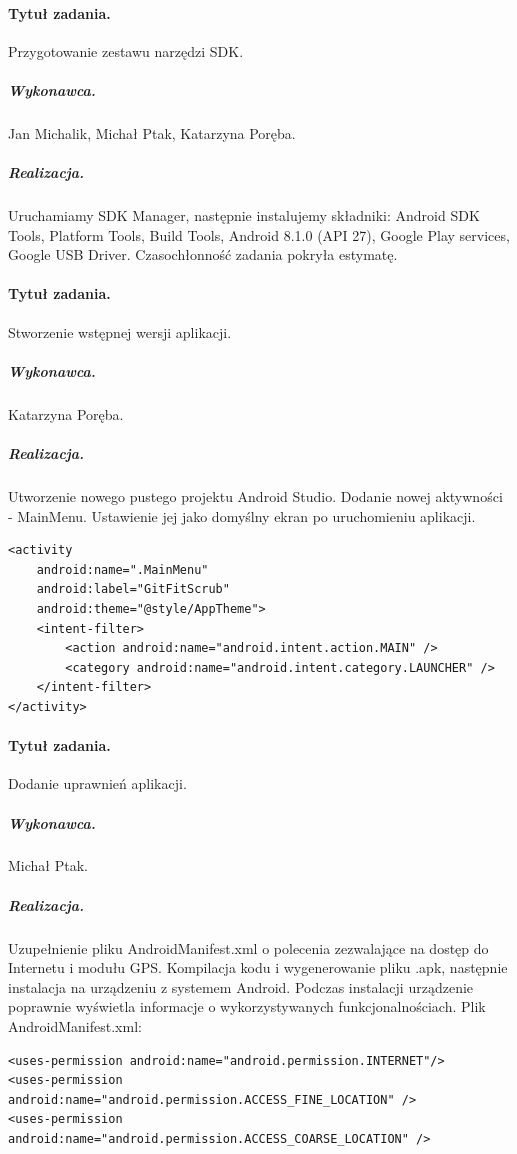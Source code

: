 \documentclass[a4paper]{article}
\begin{document}
\paragraph{Tytuł zadania.} Przygotowanie zestawu narzędzi SDK.
\subparagraph{Wykonawca.} Jan Michalik, Michał Ptak, Katarzyna Poręba.
\subparagraph{Realizacja.} Uruchamiamy SDK Manager, następnie instalujemy składniki: Android SDK Tools, Platform Tools, Build Tools, Android 8.1.0 (API 27), Google Play services, Google USB Driver. Czasochłonność zadania pokryła estymatę.

\paragraph{Tytuł zadania.} Stworzenie wstępnej wersji aplikacji.
\subparagraph{Wykonawca.} Katarzyna Poręba.
\subparagraph{Realizacja.} Utworzenie nowego pustego projektu Android Studio. Dodanie nowej aktywności - MainMenu. Ustawienie jej jako domyślny ekran po uruchomieniu aplikacji.
\begin{lstlisting}[style=xml]
	<activity
	android:name=".MainMenu"
	android:label="GitFitScrub"
	android:theme="@style/AppTheme">
	<intent-filter>
		<action android:name="android.intent.action.MAIN" />
		<category android:name="android.intent.category.LAUNCHER" />
	</intent-filter>
</activity>
\end{lstlisting}

\paragraph{Tytuł zadania.} Dodanie uprawnień aplikacji.
\subparagraph{Wykonawca.} Michał Ptak.
\subparagraph{Realizacja.} Uzupełnienie pliku AndroidManifest.xml o polecenia zezwalające na dostęp do Internetu i modułu GPS. Kompilacja kodu i wygenerowanie pliku .apk, następnie instalacja na urządzeniu z systemem Android. Podczas instalacji urządzenie poprawnie wyświetla informacje o wykorzystywanych funkcjonalnościach.
Plik AndroidManifest.xml:
\begin{lstlisting}[style=xml]
	<uses-permission android:name="android.permission.INTERNET"/>
<uses-permission android:name="android.permission.ACCESS_FINE_LOCATION" />
<uses-permission android:name="android.permission.ACCESS_COARSE_LOCATION" />
\end{lstlisting}
\end{document}
